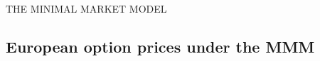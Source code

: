 \documentclass[unknownkeysallowed, compress]{beamer}
\theoremstyle{plain}
\begin{document}
\begin{frame}[allowframebreaks]{THE MINIMAL MARKET MODEL}





\end{frame}

\subsection{European option prices under the MMM}
\end{document}
